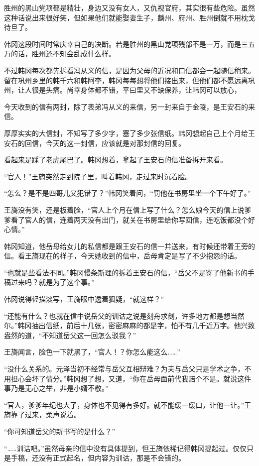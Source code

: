 胜州的黑山党项都是精壮，身边又没有女人，又仇视官府，其实很有些危险。虽然这种话说出来很好笑，但如果他们就能娶妻生子，麟州、府州、胜州倒就不用枕戈待旦了。

韩冈这段时间时常庆幸自己的决断。若是胜州的黑山党项残部不是一万，而是三五万的话，胜州还不知会乱成什么样。

不过韩冈每次都先拆看冯从义的信，是因为父母的近况和口信都会一起随信稍来。留在巩州乡里的韩千六和韩阿李，韩冈每每想将他们接出来，但他们都不愿远离巩州，让人很是头痛。尚幸身体都不错，平曰里又不缺保养，让韩冈可以放心，

今天收到的信有两封，除了表弟冯从义的来信，另一封来自于金陵，是王安石的来信。

厚厚实实的大信封，不知写了多少字，塞了多少张信纸。韩冈想起自己上个月给王安石的回信，今天的这一封信，应该就是对那封信的回复。

看起来是踩了老虎尾巴了。韩冈想着，拿起了王安石的信准备拆开来看。

“官人！”王旖突然走到院子里，叫着韩冈，走过来时沉着脸。

“怎么？是不是四哥儿又犯错了？”韩冈笑着问，“罚他在书房里坐一个下午好了。”

王旖没有笑，还是板着脸，“官人上个月在信上写了什么？怎么娘今天的信上说爹爹看了官人的信，连着两天没有出门，就关在书房里给你写回信，连吃饭都没个好心情。”

韩冈知道，他岳母给女儿的私信都是跟王安石的信一并送来，有时候还带着王旁的信。看王旖现在的样子，今天她收到的信中，岳母肯定是写了不少抱怨的话。

“也就是些看法不同。”韩冈慢条斯理的拆着王安石的信，“岳父不是寄了他新书的手稿过来吗？就是为了这个事。”

韩冈说得轻描淡写，王旖眼中透着狐疑，“就这样？”

“还能有什么？也就在信中说岳父的训诂之说是刻舟求剑，许多地方都是想当然尔。”韩冈抽出信纸，前后十几张，密密麻麻的都是字，怕不有几千近万字。他兴致盎然的道，“不知道岳父这一回怎么驳我？”

王旖闻言，脸色一下就黑了，“官人！？你怎么能这么……”

“没什么关系的。元泽当初不经常与岳父互相辩难？为夫与岳父只是学术之争，不用担心会坏了情分。”韩冈想了想，又道，“你在岳母面前代我赔个不是。就说这件事乃是无心之举，非是小婿不敬。”

“官人，爹爹年纪也大了，身体也不见得有多好。就不能缓一缓口，让他一让。”王旖靠了过来，柔声说着。

“你可知道岳父的新书写的是什么？”

“……训诂吧。”虽然母亲的信中没有具体提到，但王旖依稀记得韩冈提起过。仅仅只是手稿，还没有正式起名，但内容为训诂，那是不会错的。

